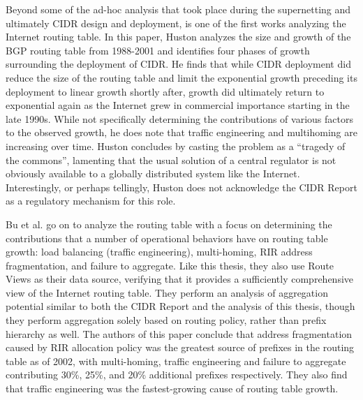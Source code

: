 Beyond some of the ad-hoc analysis that took place during the supernetting \cite{rfc1338} and ultimately CIDR \cite{rfc1519} design and deployment, \cite{Huston:2001bs} is one of the first works analyzing the Internet routing table. In this paper, Huston analyzes the size and growth of the BGP routing table from 1988-2001 and identifies four phases of growth surrounding the deployment of CIDR. He finds that while CIDR deployment did reduce the size of the routing table and limit the exponential growth preceding its deployment to linear growth shortly after, growth did ultimately return to exponential again as the Internet grew in commercial importance starting in the late 1990s. While not specifically determining the contributions of various factors to the observed growth, he does note that traffic engineering and multihoming are increasing over time. Huston concludes by casting the problem as a ``tragedy of the commons'', lamenting that the usual solution of a central regulator is not obviously available to a globally distributed system like the Internet. Interestingly, or perhaps tellingly, Huston does not acknowledge the CIDR Report as a regulatory mechanism for this role.

Bu et al. \cite{Bu:2004fk} go on to analyze the routing table with a focus on determining the contributions that a number of operational behaviors have on routing table growth: load balancing (traffic engineering), multi-homing, RIR address fragmentation, and failure to aggregate. Like this thesis, they also use Route Views as their data source, verifying that it provides a sufficiently comprehensive view of the Internet routing table. They perform an analysis of aggregation potential similar to both the CIDR Report and the analysis of this thesis, though they perform aggregation solely based on routing policy, rather than prefix hierarchy as well. The authors of this paper conclude that address fragmentation caused by RIR allocation policy was the greatest source of prefixes in the routing table as of 2002, with multi-homing, traffic engineering and failure to aggregate contributing 30\%, 25\%, and 20\% additional prefixes respectively. They also find that traffic engineering was the fastest-growing cause of routing table growth.

